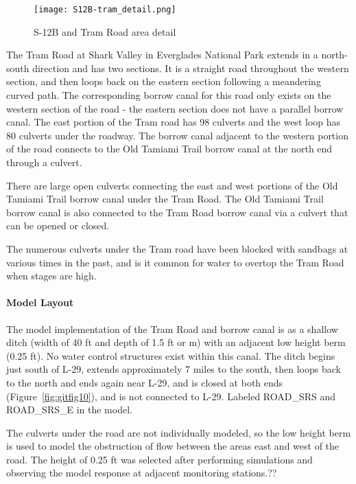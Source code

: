 \begin{figure}[!h]
  \begin{center}
  \texttt{[image: S12B-tram\_detail.png]}
  \caption{S-12B and Tram Road area detail}
  \end{center}
\end{figure}

The Tram Road at Shark Valley in Everglades National Park extends in a north-south direction and has two sections. It is a straight road throughout the western section, and then loops back on the eastern section following a meandering curved path. The corresponding borrow canal for this road only exists on the western section of the road - the eastern section does not have a parallel borrow canal. The east portion of the Tram road has 98 culverts and the west loop has 80 culverts under the roadway. The borrow canal adjacent to the western portion of the road connects to the Old Tamiami Trail borrow canal at the north end through a culvert.

There are large open culverts connecting the east and west portions of the Old Tamiami Trail borrow canal under the Tram Road. The Old Tamiami Trail borrow canal is also connected to the Tram Road borrow canal via a culvert that can be opened or closed.

The numerous culverts under the Tram road have been blocked with sandbags at various times in the past, and is it common for water to overtop the Tram Road when stages are high.

\paragraph{Model Layout}

The model implementation of the Tram Road and borrow canal is as a shallow ditch (width of 40 ft and depth of 1.5 ft or m) with an adjacent low height berm (0.25 ft). No water control structures exist within this canal. The ditch begins just south of L-29, extends approximately 7 miles to the south, then loops back to the north and ends again near L-29, and is closed at both ends (Figure~\ref{fig:gitfig10}), and is not connected to L-29. Labeled ROAD\_SRS and ROAD\_SRS\_E in the model.

The culverts under the road are not individually modeled, so the low height berm is used to model the obstruction of flow between the areas east and west of the road. The height of 0.25 ft was selected after performing simulations and observing the model response at adjacent monitoring stations.??

